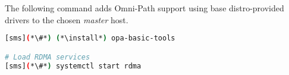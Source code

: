 The following command adds Omni-Path support using base distro-provided drivers
to the chosen {\em master} host.

\begin{lstlisting}[language=bash,keywords={}]
[sms](*\#*) (*\install*) opa-basic-tools

# Load RDMA services
[sms](*\#*) systemctl start rdma
\end{lstlisting}



